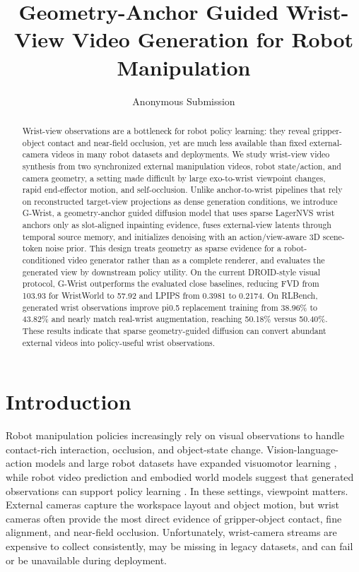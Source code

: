 \documentclass[letterpaper]{article}
\title{Geometry-Anchor Guided Wrist-View Video Generation for Robot Manipulation}
\author{Anonymous Submission}
\newcommand{\method}{G-Wrist}
\begin{document}
\maketitle

\begin{abstract}
Wrist-view observations are a bottleneck for robot policy learning: they reveal gripper-object contact and near-field occlusion, yet are much less available than fixed external-camera videos in many robot datasets and deployments.
We study wrist-view video synthesis from two synchronized external manipulation videos, robot state/action, and camera geometry, a setting made difficult by large exo-to-wrist viewpoint changes, rapid end-effector motion, and self-occlusion.
Unlike anchor-to-wrist pipelines that rely on reconstructed target-view projections as dense generation conditions, we introduce \method, a geometry-anchor guided diffusion model that uses sparse LagerNVS wrist anchors only as slot-aligned inpainting evidence, fuses external-view latents through temporal source memory, and initializes denoising with an action/view-aware 3D scene-token noise prior.
This design treats geometry as sparse evidence for a robot-conditioned video generator rather than as a complete renderer, and evaluates the generated view by downstream policy utility.
On the current DROID-style visual protocol, \method{} outperforms the evaluated close baselines, reducing FVD from 103.93 for WristWorld to 57.92 and LPIPS from 0.3981 to 0.2174.
On RLBench, generated wrist observations improve pi0.5 replacement training from 38.96\% to 43.82\% and nearly match real-wrist augmentation, reaching 50.18\% versus 50.40\%.
These results indicate that sparse geometry-guided diffusion can convert abundant external videos into policy-useful wrist observations.
\end{abstract}

\section{Introduction}

Robot manipulation policies increasingly rely on visual observations to handle contact-rich interaction, occlusion, and object-state change.
Vision-language-action models and large robot datasets have expanded visuomotor learning \cite{brohan2023rt2,kim2024openvla,khazatsky2025droid}, while robot video prediction and embodied world models suggest that generated observations can support policy learning \cite{hu2025vpp,zhen2025tesseract,jang2025dreamgen}.
In these settings, viewpoint matters.
External cameras capture the workspace layout and object motion, but wrist cameras often provide the most direct evidence of gripper-object contact, fine alignment, and near-field occlusion.
Unfortunately, wrist-camera streams are expensive to collect consistently, may be missing in legacy datasets, and can fail or be unavailable during deployment.
\end{document}
